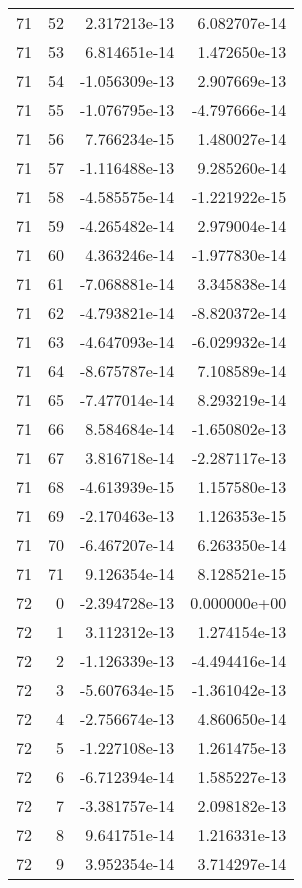\begin{tabular}{rrrr}
  71 &   52 &  2.317213e-13 &  6.082707e-14 \\
  71 &   53 &  6.814651e-14 &  1.472650e-13 \\
  71 &   54 & -1.056309e-13 &  2.907669e-13 \\
  71 &   55 & -1.076795e-13 & -4.797666e-14 \\
  71 &   56 &  7.766234e-15 &  1.480027e-14 \\
  71 &   57 & -1.116488e-13 &  9.285260e-14 \\
  71 &   58 & -4.585575e-14 & -1.221922e-15 \\
  71 &   59 & -4.265482e-14 &  2.979004e-14 \\
  71 &   60 &  4.363246e-14 & -1.977830e-14 \\
  71 &   61 & -7.068881e-14 &  3.345838e-14 \\
  71 &   62 & -4.793821e-14 & -8.820372e-14 \\
  71 &   63 & -4.647093e-14 & -6.029932e-14 \\
  71 &   64 & -8.675787e-14 &  7.108589e-14 \\
  71 &   65 & -7.477014e-14 &  8.293219e-14 \\
  71 &   66 &  8.584684e-14 & -1.650802e-13 \\
  71 &   67 &  3.816718e-14 & -2.287117e-13 \\
  71 &   68 & -4.613939e-15 &  1.157580e-13 \\
  71 &   69 & -2.170463e-13 &  1.126353e-15 \\
  71 &   70 & -6.467207e-14 &  6.263350e-14 \\
  71 &   71 &  9.126354e-14 &  8.128521e-15 \\
  72 &    0 & -2.394728e-13 &  0.000000e+00 \\
  72 &    1 &  3.112312e-13 &  1.274154e-13 \\
  72 &    2 & -1.126339e-13 & -4.494416e-14 \\
  72 &    3 & -5.607634e-15 & -1.361042e-13 \\
  72 &    4 & -2.756674e-13 &  4.860650e-14 \\
  72 &    5 & -1.227108e-13 &  1.261475e-13 \\
  72 &    6 & -6.712394e-14 &  1.585227e-13 \\
  72 &    7 & -3.381757e-14 &  2.098182e-13 \\
  72 &    8 &  9.641751e-14 &  1.216331e-13 \\
  72 &    9 &  3.952354e-14 &  3.714297e-14 \\

\end{tabular}
